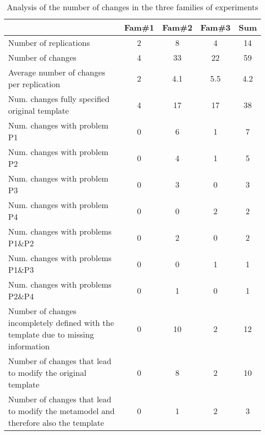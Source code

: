 
\begin{table}
\caption{Analysis of the number of changes in the three families of experiments}
\label{tab:agrupa}
\begin{minipage}{6cm}

\begin{tabular}{| p{6.5cm}| c | c | c |c |}
\hline
 & \textbf{Fam\#1} & \textbf{Fam\#2} & \textbf{Fam\#3} & Sum\\ \hline
Number of replications & 2 & 8 & 4 & 14\\ \hline
Number of changes  & 4 & 33 & 22 & 59\\ \hline
Average number of changes per replication & 2 & 4.1 & 5.5 & 4.2\\ \hline

Num. changes fully specified original template & 4 & 17 & 17 & 38\\ \hline
Num. changes with problem P1 & 0 & 6 & 1 & 7\\ \hline  %
Num. changes with problem P2 & 0 & 4 & 1 & 5\\ \hline %
Num. changes with problem P3 & 0 & 3 & 0 & 3\\ \hline %
Num. changes with problem P4 & 0 & 0 & 2 & 2\\\hline %
Num. changes with problems P1\&P2  & 0 & 2 & 0 & 2\\ \hline %
Num. changes with problems P1\&P3 & 0 & 0 & 1 & 1\\ \hline %
Num. changes with problems P2\&P4 & 0 & 1 & 0 & 1\\ \hline %
 \hline 
Number of changes incompletely defined with the template due to missing information & 0 & 10 & 2 & 12\\ \hline %

Number of changes that lead to modify the original template & 0 & 8 & 2 & 10\\ \hline 

Number of changes that lead to modify the metamodel and therefore also the template & 0 & 1 & 2 & 3\\ \hline 

\end{tabular}
\end{minipage}


\end{table}



